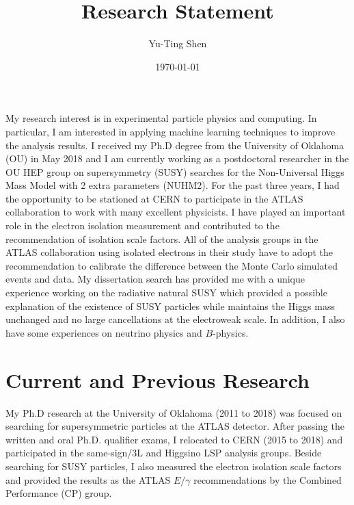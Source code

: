 \documentclass[12pt]{article}
\title{Research Statement}
\author{Yu-Ting Shen}
\affil{Department of Physics and Astronomy\\ University of Oklahoma}
\date{\today}
\begin{document}
\maketitle

My research interest is in experimental particle physics and computing.
In particular, I am interested in applying machine learning techniques to improve the analysis results.
I received my Ph.D degree from the University of Oklahoma (OU) in May 2018 and I am currently working as a postdoctoral researcher in the OU HEP group on supersymmetry (SUSY) searches for the Non-Universal Higgs Mass Model with 2 extra parameters (NUHM2).
For the past three years, I had the opportunity to be stationed at CERN to participate in the ATLAS collaboration to work with many excellent physicists.
I have played an important role in the electron isolation measurement and contributed to the recommendation of isolation scale factors.
All of the analysis groups in the ATLAS collaboration using isolated electrons in their study have to adopt the recommendation to calibrate the difference between the Monte Carlo simulated events and data.
My dissertation search has provided me with a unique experience working on the radiative natural SUSY which provided a possible explanation of the existence of SUSY particles while maintains the Higgs mass unchanged and no large cancellations at the electroweak scale.
In addition, I also have some experiences on neutrino physics and $B$-physics.


\section{Current and Previous Research}
My Ph.D research at the University of Oklahoma (2011 to 2018) was focused on searching for supersymmetric particles at the ATLAS detector.
After passing the written and oral Ph.D. qualifier exams, I relocated to CERN (2015 to 2018) and participated in the same-sign/3L and Higgsino LSP analysis groups.
Beside searching for SUSY particles, I also measured the electron isolation scale factors and provided the results as the ATLAS $E/\gamma$ recommendations by the Combined Performance (CP) group.
\end{document}
